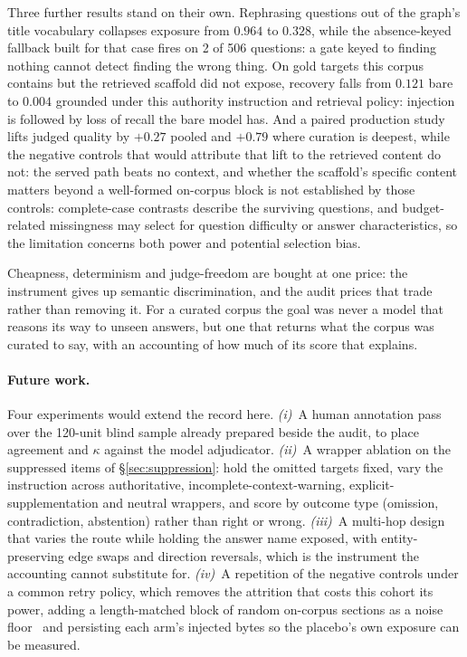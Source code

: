 \documentclass[10pt,twocolumn]{article}
\begin{document}
Three further results stand on their own. Rephrasing questions out of the graph's title vocabulary collapses exposure from $0.964$ to $0.328$, while the absence-keyed fallback built for that case fires on 2 of 506 questions: a gate keyed to finding nothing cannot detect finding the wrong thing. On gold targets this corpus contains but the retrieved scaffold did not expose, recovery falls from $0.121$ bare to $0.004$ grounded under this authority instruction and retrieval policy: injection is followed by loss of recall the bare model has. And a paired production study lifts judged quality by $+0.27$ pooled and $+0.79$ where curation is deepest, while the negative controls that would attribute that lift to the retrieved content do not: the served path beats no context, and whether the scaffold's specific content matters beyond a well-formed on-corpus block is not established by those controls: complete-case contrasts describe the surviving questions, and budget-related missingness may select for question difficulty or answer characteristics, so the limitation concerns both power and potential selection bias.

Cheapness, determinism and judge-freedom are bought at one price: the instrument gives up semantic discrimination, and the audit prices that trade rather than removing it. For a curated corpus the goal was never a model that reasons its way to unseen answers, but one that returns what the corpus was curated to say, with an accounting of how much of its score that explains.

\paragraph{Future work.} Four experiments would extend the record here. \emph{(i)}~A human annotation pass over the 120-unit blind sample already prepared beside the audit, to place agreement and $\kappa$ against the model adjudicator. \emph{(ii)}~A wrapper ablation on the suppressed items of \S\ref{sec:suppression}: hold the omitted targets fixed, vary the instruction across authoritative, incomplete-context-warning, explicit-supplementation and neutral wrappers, and score by outcome type (omission, contradiction, abstention) rather than right or wrong. \emph{(iii)}~A multi-hop design that varies the route while holding the answer name exposed, with entity-preserving edge swaps and direction reversals, which is the instrument the accounting cannot substitute for. \emph{(iv)}~A repetition of the negative controls under a common retry policy, which removes the attrition that costs this cohort its power, adding a length-matched block of random on-corpus sections as a noise floor~\cite{cuconasu2024poweofnoise} and persisting each arm's injected bytes so the placebo's own exposure can be measured.
\end{document}
